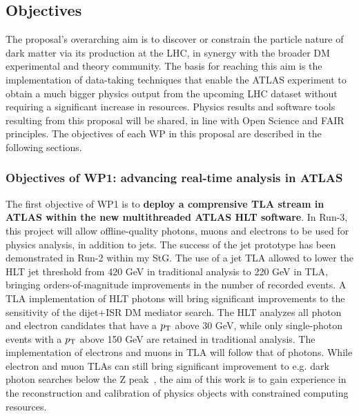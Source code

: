 \subsection{Objectives}
\label{sub:objectives}
\smallskip

The proposal’s overarching aim is to discover or constrain the particle nature of dark matter via its production at the LHC, 
in synergy with the broader DM experimental and theory community. 
The basis for reaching this aim is the implementation of data-taking techniques that enable the ATLAS experiment to obtain a much bigger physics output from the upcoming LHC dataset without requiring a significant increase in resources. 
Physics results and software tools resulting from this proposal will be shared, in line with Open Science and FAIR principles.
The objectives of each WP in this proposal are described in the following sections. 


\subsubsection{Objectives of WP1: advancing real-time analysis in ATLAS}

The first objective of WP1 is to \textbf{deploy a comprensive TLA stream in ATLAS within the new multithreaded ATLAS HLT software}. %
In Run-3, this project will allow offline-quality photons, muons and electrons to be used for physics analysis, in addition to jets. 
The success of the jet prototype has been demonstrated in Run-2 within my StG. 
The use of a jet TLA allowed to lower the HLT jet threshold from 420 GeV in traditional analysis to 220 GeV in TLA, bringing orders-of-magnitude improvements in the number of recorded events. 
A TLA implementation of HLT photons will bring significant improvements to the sensitivity of the dijet+ISR DM mediator search. 
The HLT analyzes all photon and electron candidates that have a $p_{\rm{T}}$ above 30 GeV, 
while only single-photon events with a $p_{\rm{T}}$ above 150 GeV are retained in traditional analysis. 
The implementation of electrons and muons in TLA will follow that of photons.
While electron and muon TLAs can still bring significant improvement to e.g. dark photon searches below the Z peak~\cite{ToBeCited}, %
the aim of this work is to gain experience in the reconstruction and calibration of physics objects with constrained computing resources. 

